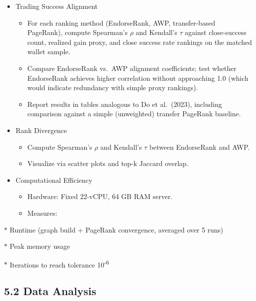 \begin{itemize}
\item[\textbullet] Trading Success Alignment
\begin{itemize}
\item[\textendash] For each ranking method (EndorseRank, AWP, transfer-based PageRank), compute Spearman's \emph{\(\rho\) }and Kendall's \emph{\(\tau\) }against close-success count, realized gain proxy, and close success rate rankings on the matched wallet sample.
\item[\textendash] Compare EndorseRank vs.\ AWP alignment coefficients; test whether EndorseRank achieves higher correlation without approaching 1.0 (which would indicate redundancy with simple proxy rankings).
\item[\textendash] Report results in tables analogous to Do et al.\ (2023), including comparison against a simple (unweighted) transfer PageRank baseline.
\end{itemize}
\item[\textbullet] Rank Divergence
\begin{itemize}
\item[\textendash] Compute Spearman's \emph{\(\rho\) }and Kendall's \emph{\(\tau\) }between EndorseRank and AWP.
\item[\textendash] Visualize via scatter plots and top-k Jaccard overlap.
\end{itemize}
\item[\textbullet] Computational Efficiency
\begin{itemize}
\item[\textendash] Hardware: Fixed 22-vCPU, 64 GB RAM server.
\item[\textendash] Measures:
\end{itemize}
\end{itemize}
\(\ast\) Runtime (graph build + PageRank convergence, averaged over 5 runs)


\(\ast\) Peak memory usage


\(\ast\) Iterations to reach tolerance 10\textsuperscript{-}\textsuperscript{6}


\subsection*{5.2 Data Analysis}
\label{sec:data-analysis}


